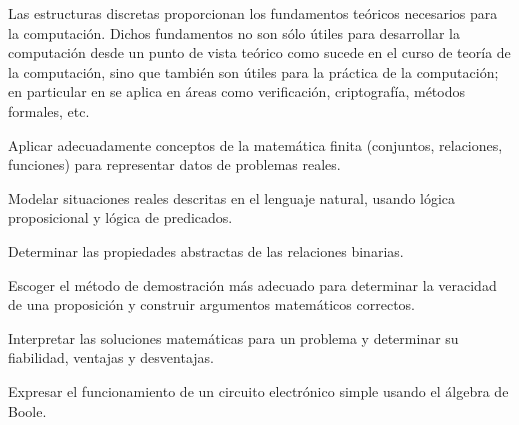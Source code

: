 \begin{syllabus}


\begin{justification}
Las estructuras discretas proporcionan los fundamentos teóricos necesarios para la computación.
Dichos fundamentos no son sólo útiles para desarrollar la computación desde un punto de vista teórico
como sucede en el curso de teoría de la computación,  sino que también son útiles para la práctica de la
computación; en particular en se aplica en áreas como verificación, criptografía, métodos formales, etc.
\end{justification}

\begin{goals}
\item Aplicar adecuadamente conceptos de la matemática finita (conjuntos, relaciones, funciones) para representar datos de problemas reales.
\item Modelar situaciones reales descritas en el lenguaje natural, usando lógica proposicional y lógica de predicados.
\item Determinar las propiedades abstractas de las relaciones binarias.
\item Escoger el método de demostración más adecuado para determinar la veracidad de una proposición y construir argumentos matemáticos correctos.
\item Interpretar las soluciones matemáticas para un problema y determinar su fiabilidad, ventajas y desventajas.
\item Expresar el funcionamiento de un circuito electrónico simple usando el álgebra de Boole.
\end{goals}

\begin{outcomes}
    \item {}
    \item {}
    \item {}
\end{outcomes}

\begin{competences}
    \item {}
    \item {}
\end{competences}


\end{syllabus}
